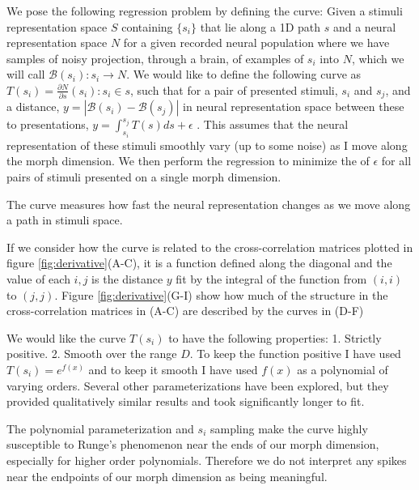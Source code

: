 We pose the following regression problem by defining the \Thielk curve:
Given a stimuli representation space $S$ containing $\{s_i\}$ that lie along a 1D path $s$ and a neural representation space $N$ for a given recorded neural population where we have samples of noisy projection, through a brain, of examples of $s_i$ into $N$, which we will call $\mathcal{B}(s_i):s_i \to N$.
We would like to define the following curve as $T(s_i)=\frac{\partial N}{\partial s} (s_i): s_i \in s$, such that for a pair of presented stimuli, $s_i$ and $s_j$, and a distance, $y=|\mathcal{B}(s_i) - \mathcal{B}(s_j)|$ in neural representation space between these to presentations, $y = \int_{s_i}^{s_j}T(s)ds + \epsilon$ . This assumes that the neural representation of these stimuli smoothly vary (up to some noise) as I move along the morph dimension. We then perform the regression to minimize the \MSE of $\epsilon$ for all pairs of stimuli presented on a single morph dimension.

The \Thielk curve measures how fast the neural representation changes as we move along a path in stimuli space. 

If we consider how the \Thielk curve is related to the cross-correlation matrices plotted in figure \ref{fig:derivative}(A-C), it is a function defined along the diagonal and the value of each $i,j$ is the distance $y$ fit by the integral of the function from $(i,i)$ to $(j, j)$. Figure \ref{fig:derivative}(G-I) show how much of the structure in the cross-correlation matrices in (A-C) are described by the \Thielk curves in (D-F)

We would like the \Thielk curve $T(s_i)$ to have the following properties: 1. Strictly positive. 2. Smooth over the range $D$.
To keep the function positive I have used $T(s_i)=e^{f(x)}$ and to keep it smooth I have used $f(x)$ as a polynomial of varying orders.
Several other parameterizations have been explored, but they provided qualitatively similar results and took significantly longer to fit.

The polynomial parameterization and $s_i$ sampling make the \Thielk curve highly susceptible to Runge's phenomenon near the ends of our morph dimension, especially for higher order polynomials. Therefore we do not interpret any spikes near the endpoints of our morph dimension as being meaningful.

